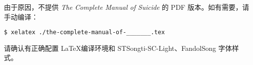 \documentclass[UTF8]{ctexart}
\begin{document}
由于原因，不提供 \textit{The Complete Manual of Suicide} 的 PDF 版本。如有需要，请手动编译：

\begin{lstlisting}
$ xelatex ./the-complete-manual-of-_______.tex
\end{lstlisting}

请确认有正确配置 \LaTeX 编译环境和 STSongti-SC-Light、FandolSong 字体样式。
\end{document}
